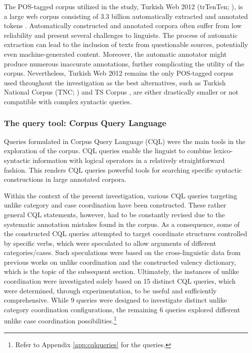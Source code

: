 The POS-tagged corpus utilized in the study, Turkish Web 2012 (trTenTen; \citealp{vit2012}), is a large web corpus consisting of 3.3 billion automatically extracted and annotated  tokens \citep{tekintrmorph}. Automatically constructed and annotated corpora often suffer from low reliability and present several challenges to linguists. The process of automatic extraction can lead to the inclusion of texts from questionable sources, potentially even machine-generated content. Moreover, the automatic annotator might produce numerous inaccurate annotations, further complicating the utility of the corpus. Nevertheless, Turkish Web 2012 remains the only POS-tagged corpus used throughout the investigation as the best alternatives, such as Turkish National Corpus (TNC; \citealp{aksan-etal-2012-construction}) and TS Corpus \citep{Sezer2017}, are either drastically smaller or not compatible with complex syntactic queries.

\subsubsection{The query tool: Corpus Query Language}

Queries formulated in Corpus Query Language (CQL) were the main tools in the exploration of the corpus. CQL queries enable the linguist to combine lexico-syntactic information with logical operators in a relatively straightforward fashion. This renders CQL queries powerful tools for searching specific syntactic constructions in large annotated corpora. 

Within the context of the present investigation, various CQL queries targeting unlike category and case coordination have been constructed. These rather general CQL statements, however, had to be constantly revised due to the systematic annotation mistakes found in the corpus. As a consequence, some of the constructed CQL queries attempted to target coordinate structures controlled by specific verbs, which were speculated to allow arguments of different categories/cases. Such speculations were based on the cross-linguistic data from previous works on unlike coordination and the constructed valency dictionary, which is the topic of the subsequent section. Ultimately, the instances of unlike coordination were investigated solely based on 15 distinct CQL queries, which were determined, through experimentation, to be useful and sufficiently comprehensive. While 9 queries were designed to investigate distinct unlike category coordination configurations, the remaining 6 queries explored different unlike case coordination possibilities.\footnote{Refer to Appendix \ref{app:cqlqueries} for the queries.}

